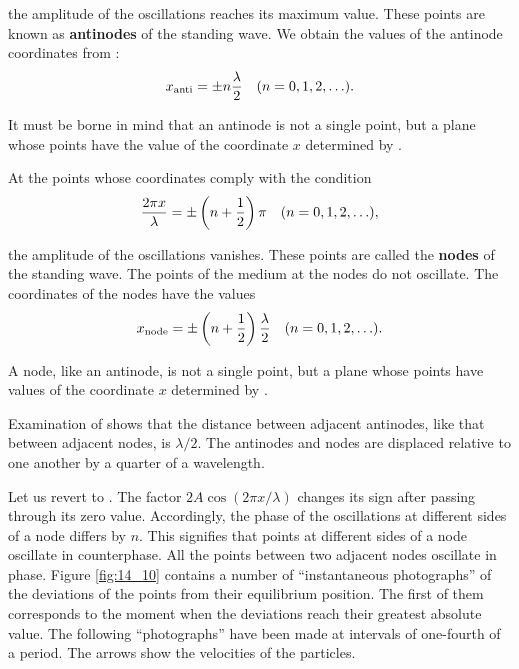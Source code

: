 \noindent
the amplitude of the oscillations reaches its maximum value.
These points are known as \textbf{antinodes} of the standing wave.
We obtain the values of the antinode coordinates from :
\begin{equation}\label{eq:14_56}
	x_{\text{anti}} = \pm n \frac{\lambda}{2}\quad (n = 0, 1, 2, \ldots).
\end{equation}

It must be borne in mind that an antinode is not a single point, but a plane whose points have the value of the coordinate $x$ determined by .

At the points whose coordinates comply with the condition
\begin{equation*}
	\frac{2\pi x}{\lambda} = \pm \left(n + \frac{1}{2}\right) \pi \quad (n = 0, 1, 2, \ldots),
\end{equation*}

\noindent
the amplitude of the oscillations vanishes.
These points are called the \textbf{nodes} of the standing wave.
The points of the medium at the nodes do not oscillate.
The coordinates of the nodes have the values
\begin{equation}\label{eq:14_57}
	x_{\text{node}} = \pm \left(n + \frac{1}{2}\right) \frac{\lambda}{2} \quad (n = 0, 1, 2, \ldots).
\end{equation}

\noindent
A node, like an antinode, is not a single point, but a plane whose points have values of the coordinate $x$ determined by .

Examination of  shows that the distance between adjacent antinodes, like that between adjacent nodes, is $\lambda/2$.
The antinodes and nodes are displaced relative to one another by a quarter of a wavelength.

Let us revert to .
The factor $2A\cos(2\pi x/\lambda)$ changes its sign after passing through its zero value.
Accordingly, the phase of the oscillations at different sides of a node differs by $n$.
This signifies that points at different sides of a node oscillate in counterphase.
All the points between two adjacent nodes oscillate in phase.
Figure \ref{fig:14_10} contains a number of ``instantaneous photographs'' of the deviations of the points from their equilibrium position.
The first of them corresponds to the moment when the deviations reach their greatest absolute value.
The following ``photographs'' have been made at intervals of one-fourth of a period.
The arrows show the velocities of the particles.

